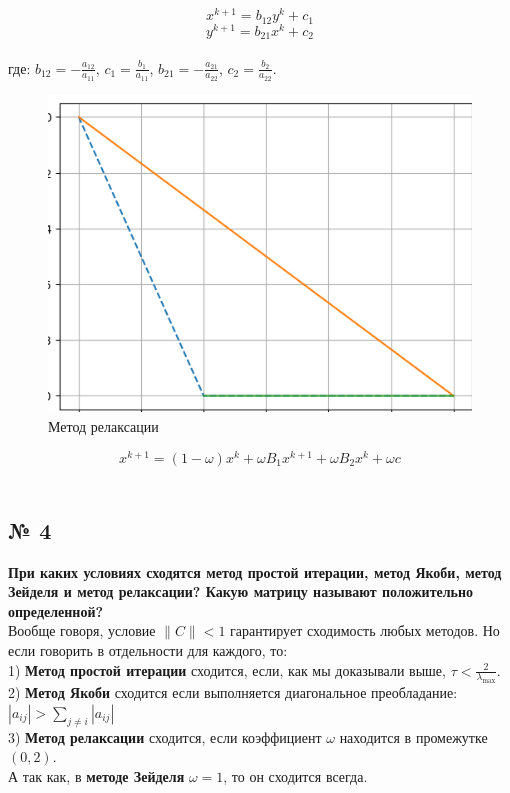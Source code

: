 \documentclass[a4paper, 14pt]{article}
\begin{document}
\begin{equation*}
x^{k+1} = b_{12} y^k + c_1
\end{equation*}
\begin{equation*}
y^{k+1} = b_{21} x^k + c_2
\end{equation*}\\

где: $b_{12} = - \frac{a_{12}}{a_{11}}$, $c_1 = \frac{b_1}{a_{11}}$, $b_{21} = - \frac{a_{21}}{a_{22}}$, $c_2=\frac{b_2}{a_{22}}$.
\newpage


\begin{figure}[h]
  \centering 
\includegraphics[scale=0.7]{3new.png}
  \caption{Метод релаксации}
\end{figure}
 
 \begin{equation*}
x^{k+1} = \left( 1 - \omega \right) x^k + \omega B_1 x^{k+1} + \omega B_2 x^k + \omega c
\end{equation*}\\




\subsection*{№ 4}

\textbf{При каких условиях сходятся метод простой итерации,
метод Якоби, метод Зейделя и метод релаксации? Какую
матрицу называют положительно определенной?}\\

Вообще говоря, условие $\lVert C \rVert<1$ гарантирует сходимость любых методов. Но если говорить в отдельности для каждого, то:\\
1) \textbf{Метод простой итерации} сходится, если, как мы доказывали выше, $\tau < \frac{2}{\lambda_{\max}}$.\\
2) \textbf{Метод Якоби} сходится если выполняется диагональное преобладание:\\
$|a_{ij}|>\sum_{j \neq i} |a_{ij}|$\\
3) \textbf{Метод релаксации} сходится, если коэффициент $\omega$ находится в промежутке $(0,2)$.\\ А так как, в \textbf{методе Зейделя} $\omega = 1$, то он сходится всегда.\\
\end{document}
